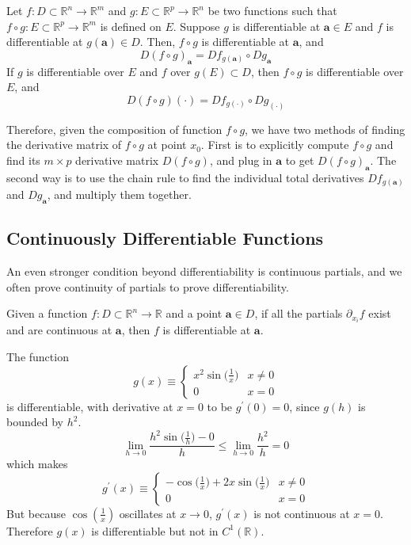   \begin{theorem}
  Let $f: D \subset \mathbb{R}^n \longrightarrow \mathbb{R}^m$ and $g: E \subset \mathbb{R}^p \longrightarrow \mathbb{R}^n$ be two functions such that $f \circ g: E \subset \mathbb{R}^p \longrightarrow \mathbb{R}^m$ is defined on $E$. Suppose $g$ is differentiable at $\mathbf{a} \in E$ and $f$ is differentiable at $g(\mathbf{a}) \in D$. Then, $f \circ g$ is differentiable at $\mathbf{a}$, and 
  \[D (f \circ g)_\mathbf{a} = D f_{g(\mathbf{a})} \circ D g_\mathbf{a}\]
  If $g$ is differentiable over $E$ and $f$ over $g(E) \subset D$, then $f \circ g$ is differentiable over $E$, and 
  \[D (f \circ g)(\cdot)  = D f_{g(\cdot)} \circ D g_{(\cdot)}\]
  \end{theorem}

  Therefore, given the composition of function $f \circ g$, we have two methods of finding the derivative matrix of $f \circ g$ at point $x_0$. First is to explicitly compute $f \circ g$ and find its $m \times p$ derivative matrix $D (f \circ g)$, and plug in $\mathbf{a}$ to get $D(f\circ g)_\mathbf{a}$. The second way is to use the chain rule to find the individual total derivatives $D f_{g(\mathbf{a})}$ and $D g_\mathbf{a}$, and multiply them together. 

\subsection{Continuously Differentiable Functions}

  An even stronger condition beyond differentiability is continuous partials, and we often prove continuity of partials to prove differentiability. 

  \begin{theorem}
    Given a function $f: D \subset \mathbb{R}^n \longrightarrow \mathbb{R}$ and a point $\mathbf{a} \in D$, if all the partials $\partial_{x_i} f$ exist and are continuous at $\mathbf{a}$, then $f$ is differentiable at $\mathbf{a}$. 
  \end{theorem}

  \begin{example}
    The function 
    \[g(x) \equiv \begin{cases}
    x^2 \sin\Big(\frac{1}{x}\Big) & x \neq 0 \\
    0 & x = 0
    \end{cases}\]
    is differentiable, with derivative at $x = 0$ to be $g^\prime(0) = 0$, since $g(h)$ is bounded by $h^2$. 
    \[\lim_{h \rightarrow 0} \frac{h^2 \sin\big(\frac{1}{h}\big) - 0}{h} \leq \lim_{h \rightarrow 0} \frac{h^2}{h} = 0\]
    which makes 
    \[g^\prime (x) \equiv \begin{cases}
    - \cos \Big( \frac{1}{x}\Big) + 2 x \sin\Big(\frac{1}{x}\Big) & x \neq 0 \\
    0 & x = 0
    \end{cases}\]
    But because $\cos(\frac{1}{x})$ oscillates at $x \rightarrow 0$, $g^\prime (x)$ is not continuous at $x = 0$. Therefore $g(x)$ is differentiable but not in $C^1(\mathbb{R})$. 
  \end{example}

